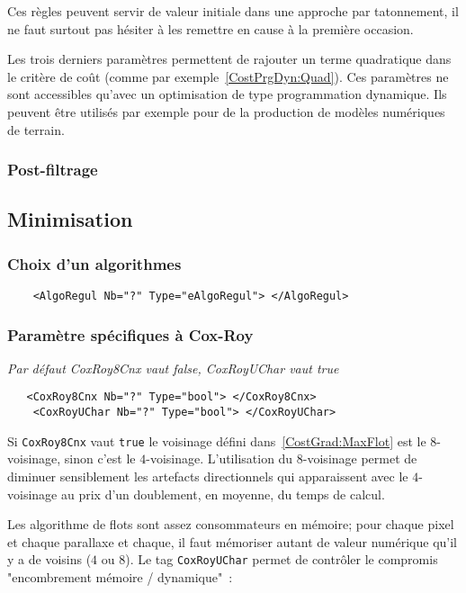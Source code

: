 Ces r\`egles peuvent servir de valeur initiale dans une approche par
tatonnement, il ne faut surtout pas h\'esiter \`a les remettre en cause
\`a la premi\`ere occasion.

Les trois derniers param\`etres permettent de rajouter un terme
quadratique dans le crit\`ere de co\^ut (comme par
exemple~\ref{CostPrgDyn:Quad}). Ces param\`etres ne sont accessibles
qu'avec un optimisation de type programmation dynamique.
Ils peuvent \^etre utilis\'es par exemple pour de la production
de mod\`eles num\'eriques de terrain.

\subsubsection{Post-filtrage}

\subsection{Minimisation}

\subsubsection{Choix d'un algorithmes}

\begin{verbatim}
    <AlgoRegul Nb="?" Type="eAlgoRegul"> </AlgoRegul>
\end{verbatim}


\subsubsection{Param\`etre sp\'ecifiques \`a Cox-Roy}

\emph{Par d\'efaut CoxRoy8Cnx vaut false, CoxRoyUChar vaut true}

\begin{verbatim}
   <CoxRoy8Cnx Nb="?" Type="bool"> </CoxRoy8Cnx>
    <CoxRoyUChar Nb="?" Type="bool"> </CoxRoyUChar>
\end{verbatim}


Si {\tt CoxRoy8Cnx} vaut {\tt true} le voisinage d\'efini
dans~\ref{CostGrad:MaxFlot} est le $8$-voisinage, sinon c'est
le $4$-voisinage.  L'utilisation du  $8$-voisinage permet
de diminuer sensiblement les artefacts directionnels qui
apparaissent avec le  $4$-voisinage au prix d'un doublement,
en moyenne, du temps de calcul.

Les algorithme de flots sont assez consommateurs en m\'emoire;
pour chaque pixel et chaque parallaxe et chaque, il faut m\'emoriser
autant de valeur num\'erique qu'il y a de voisins ($4$ ou $8$).
Le tag {\tt CoxRoyUChar} permet de contr\^oler le compromis "encombrement
m\'emoire / dynamique"~:

